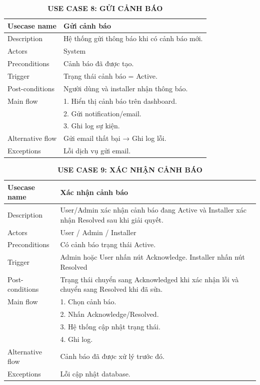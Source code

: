 \begin{table}[H]
\centering
\caption*{\textbf{USE CASE 8: GỬI CẢNH BÁO}}
\renewcommand{\arraystretch}{1.3}
\begin{tabular}{|p{4cm}|p{11cm}|}
\hline
Usecase name & Gửi cảnh báo \\
\hline
Description & Hệ thống gửi thông báo khi có cảnh báo mới. \\
\hline
Actors & System \\
\hline
Preconditions & Cảnh báo đã được tạo. \\
\hline
Trigger & Trạng thái cảnh báo = Active. \\
\hline
Post-conditions & Người dùng và installer nhận thông báo. \\
\hline
Main flow &
1. Hiển thị cảnh báo trên dashboard.\\ &
2. Gửi notification/email.\\ &
3. Ghi log sự kiện. \\
\hline
Alternative flow & Gửi email thất bại → Ghi log lỗi. \\
\hline
Exceptions & Lỗi dịch vụ gửi email. \\
\hline
\end{tabular}
\end{table}
\begin{table}[H]
\centering
\caption*{\textbf{USE CASE 9: XÁC NHẬN CẢNH BÁO}}
\renewcommand{\arraystretch}{1.3}
\begin{tabular}{|p{4cm}|p{11cm}|}
\hline
Usecase name & Xác nhận cảnh báo \\
\hline
Description & User/Admin xác nhận cảnh báo đang Active và Installer xác nhận Resolved sau khi giải quyết. \\
\hline
Actors & User / Admin / Installer \\
\hline
Preconditions & Có cảnh báo trạng thái Active. \\
\hline
Trigger & Admin hoặc User nhấn nút Acknowledge. Installer nhấn nút Resolved  \\
\hline
Post-conditions & Trạng thái chuyển sang Acknowledged khi xác nhận lỗi và chuyển sang Resolved khi đã sửa. \\
\hline
Main flow &
1. Chọn cảnh báo.\\ &
2. Nhấn Acknowledge/Resolved.\\ &
3. Hệ thống cập nhật trạng thái.\\ &
4. Ghi log. \\
\hline
Alternative flow & Cảnh báo đã được xử lý trước đó. \\
\hline
Exceptions & Lỗi cập nhật database. \\
\hline
\end{tabular}
\end{table}
